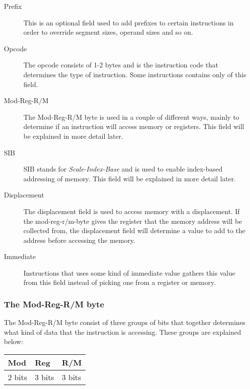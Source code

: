 \documentclass[11pt,twoside]{eitExjobb}
\begin{document}
\begin{description}
\item[Prefix] This is an optional field used to add prefixes to certain instructions in order to override segment sizes, operand sizes and so on.
\item[Opcode] The opcode consists of 1-2 bytes and is the instruction code that determines the type of instruction. Some instructions contains only of this field.
\item[Mod-Reg-R/M] The Mod-Reg-R/M byte is used in a couple of different ways, mainly to determine if an instruction will access memory or registers. This field will be explained in more detail later.  
\item[SIB] SIB stands for \emph{Scale-Index-Base} and is used to enable index-based addressing of memory. This field will be explained in more detail later.
\item[Displacement] The displacement field is used to access memory with a displacement. If the mod-reg-r/m-byte gives the register that the memory address will be collected from, the displacement field will determine a value to add to the address before accessing the memory.
\item[Immediate] Instructions that uses some kind of immediate value gathers this value from this field instead of picking one from a register or memory.
\end{description}

\subsubsection{The Mod-Reg-R/M byte}
The Mod-Reg-R/M byte consist of three groups of bits that together determines what kind of data that the instruction is accessing. These groups are explained below:\\

\begin{tabular}{|l|l|l|}
\hline
Mod & Reg & R/M \\
\hline
2 bits & 3 bits & 3 bits \\
\hline
\end{tabular}
\\\\
\end{document}

